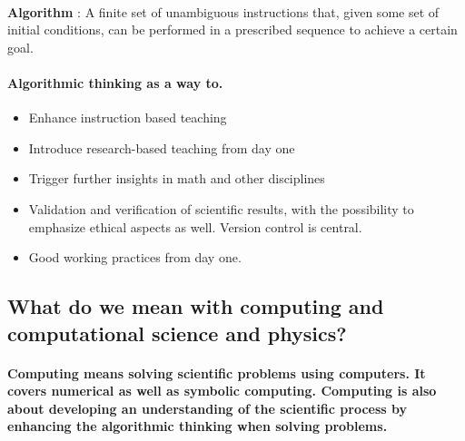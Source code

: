 \documentclass[%
oneside,                 %
final,                   %
10pt]{article}
\begin{document}
\paragraph{}
\textbf{Algorithm} : A finite set of unambiguous instructions that, given some set of initial conditions, can be performed in a prescribed sequence to achieve a certain goal.




\paragraph{Algorithmic  thinking as a way to.}

\begin{itemize}
\item Enhance instruction based teaching

\item Introduce research-based teaching  from day one

\item Trigger further insights in math and other disciplines 

\item Validation and verification of scientific results, with the possibility to emphasize ethical aspects as well. Version control is central.

\item Good working practices from day one.
\end{itemize}

\noindent





\subsection*{What do we mean with computing and computational science and physics?}

\paragraph{}

\textbf{Computing means solving scientific problems using computers. It covers numerical as well as symbolic computing. Computing is also about developing an understanding of the scientific process by enhancing the algorithmic thinking when solving problems.}
\end{document}
